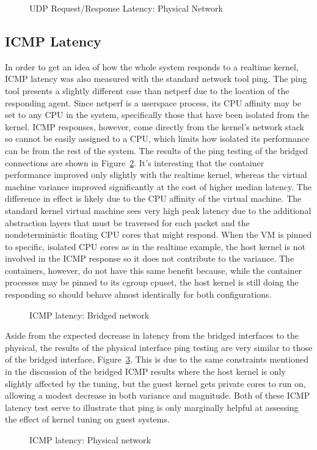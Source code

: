 \begin{figure}
    \centering
    \def\svgwidth{\columnwidth}
    
    \caption{UDP Request/Response Latency: Physical Network}
    \label{fig:udp_rr_phys}
\end{figure}

\subsection{ICMP Latency} %
\label{sub:icmplatency}
In order to get an idea of how the whole system responds to a realtime kernel, ICMP latency was also measured with the standard network tool ping.  
The ping tool presents a slightly different case than netperf due to the location of the responding agent.  
Since netperf is a userspace process, its CPU affinity may be set to any CPU in the system, specifically those that have been isolated from the kernel.
ICMP responses, however, come directly from the kernel's network stack so cannot be easily assigned to a CPU, which limits how isolated its performance can be from the rest of the system.
The results of the ping testing of the bridged connections are shown in Figure~\ref{fig:icmplatencybridge}.
It's interesting that the container performance improved only slightly with the realtime kernel, whereas the virtual machine variance improved significantly at the cost of higher median latency.  
The difference in effect is likely due to the CPU affinity of the virtual machine.  
The standard kernel virtual machine sees very high peak latency due to the additional abstraction layers that must be traversed for each packet and the nondeterministic floating CPU cores that might respond.
When the VM is pinned to specific, isolated CPU cores as in the realtime example, the host kernel is not involved in the ICMP response so it does not contribute to the variance.
The containers, however, do not have this same benefit because, while the container processes may be pinned to its cgroup cpuset, the host kernel is still doing the responding so should behave almost identically for both configurations.

\begin{figure}
    \centering
    \def\svgwidth{\columnwidth}
    
    \caption{ICMP latency: Bridged network}
    \label{fig:icmplatencybridge}
\end{figure}
Aside from the expected decrease in latency from the bridged interfaces to the physical, the results of the physical interface ping testing are very similar to those of the bridged interface, Figure~\ref{fig:icmplatencyphys}.  
This is due to the same constraints mentioned in the discussion of the bridged ICMP results where the host kernel is only slightly affected by the tuning, but the guest kernel gets private cores to run on, allowing a modest decrease in both variance and magnitude.  
Both of these ICMP latency test serve to illustrate that ping is only marginally helpful at assessing the effect of kernel tuning on guest systems.  

\begin{figure}
    \centering
    \def\svgwidth{\columnwidth}
    
    \caption{ICMP latency: Physical network}
    \label{fig:icmplatencyphys}
\end{figure}

